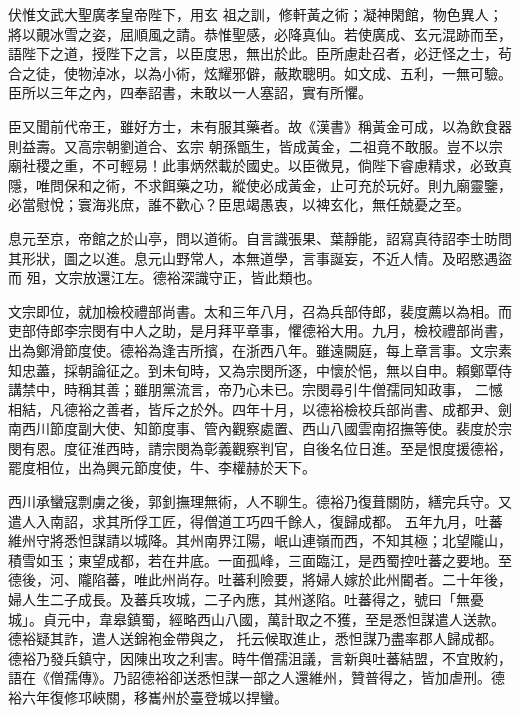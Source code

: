\begin{pinyinscope}
 伏惟文武大聖廣孝皇帝陛下，用玄
 祖之訓，修軒黃之術；凝神閑館，物色異人；將以覿冰雪之姿，屈順風之請。恭惟聖感，必降真仙。若使廣成、玄元混跡而至，語陛下之道，授陛下之言，以臣度思，無出於此。臣所慮赴召者，必迂怪之士，茍合之徒，使物淖冰，以為小術，炫耀邪僻，蔽欺聰明。如文成、五利，一無可驗。臣所以三年之內，四奉詔書，未敢以一人塞詔，實有所懼。



 臣又聞前代帝王，雖好方士，未有服其藥者。故《漢書》稱黃金可成，以為飲食器則益壽。又高宗朝劉道合、玄宗
 朝孫甑生，皆成黃金，二祖竟不敢服。豈不以宗廟社稷之重，不可輕易！此事炳然載於國史。以臣微見，倘陛下睿慮精求，必致真隱，唯問保和之術，不求餌藥之功，縱使必成黃金，止可充於玩好。則九廟靈鑒，必當慰悅；寰海兆庶，誰不歡心？臣思竭愚衷，以裨玄化，無任兢憂之至。



 息元至京，帝館之於山亭，問以道術。自言識張果、葉靜能，詔寫真待詔李士昉問其形狀，圖之以進。息元山野常人，本無道學，言事誕妄，不近人情。及昭愍遇盜而
 殂，文宗放還江左。德裕深識守正，皆此類也。



 文宗即位，就加檢校禮部尚書。太和三年八月，召為兵部侍郎，裴度薦以為相。而吏部侍郎李宗閔有中人之助，是月拜平章事，懼德裕大用。九月，檢校禮部尚書，出為鄭滑節度使。德裕為逢吉所擯，在浙西八年。雖遠闕庭，每上章言事。文宗素知忠藎，採朝論征之。到未旬時，又為宗閔所逐，中懷於悒，無以自申。賴鄭覃侍講禁中，時稱其善；雖朋黨流言，帝乃心未已。宗閔尋引牛僧孺同知政事，
 二憾相結，凡德裕之善者，皆斥之於外。四年十月，以德裕檢校兵部尚書、成都尹、劍南西川節度副大使、知節度事、管內觀察處置、西山八國雲南招撫等使。裴度於宗閔有恩。度征淮西時，請宗閔為彰義觀察判官，自後名位日進。至是恨度援德裕，罷度相位，出為興元節度使，牛、李權赫於天下。



 西川承蠻寇剽虜之後，郭釗撫理無術，人不聊生。德裕乃復葺關防，繕完兵守。又遣人入南詔，求其所俘工匠，得僧道工巧四千餘人，復歸成都。
 五年九月，吐蕃維州守將悉怛謀請以城降。其州南界江陽，岷山連嶺而西，不知其極；北望隴山，積雪如玉；東望成都，若在井底。一面孤峰，三面臨江，是西蜀控吐蕃之要地。至德後，河、隴陷蕃，唯此州尚存。吐蕃利險要，將婦人嫁於此州閽者。二十年後，婦人生二子成長。及蕃兵攻城，二子內應，其州遂陷。吐蕃得之，號曰「無憂城」。貞元中，韋皋鎮蜀，經略西山八國，萬計取之不獲，至是悉怛謀遣人送款。德裕疑其詐，遣人送錦袍金帶與之，
 托云候取進止，悉怛謀乃盡率郡人歸成都。德裕乃發兵鎮守，因陳出攻之利害。時牛僧孺沮議，言新與吐蕃結盟，不宜敗約，語在《僧孺傳》。乃詔德裕卻送悉怛謀一部之人還維州，贊普得之，皆加虐刑。德裕六年復修邛峽關，移巂州於臺登城以捍蠻。




\end{pinyinscope}
